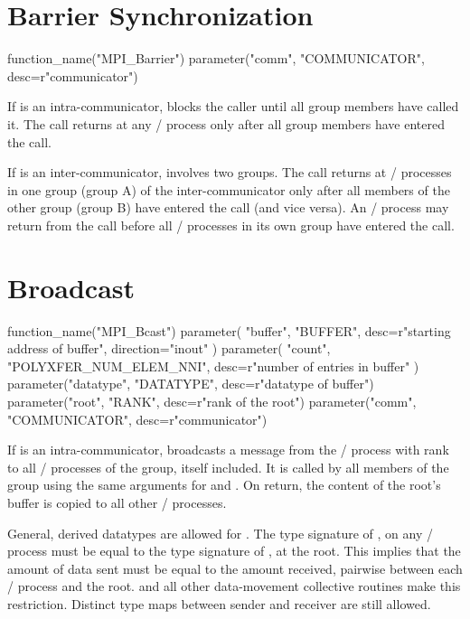 \section{Barrier Synchronization}
\label{sec:coll-barrier}

\begin{mpi-binding}
    function_name("MPI_Barrier")
    parameter("comm", "COMMUNICATOR", desc=r"communicator")
\end{mpi-binding}

If  is an intra-communicator,
 blocks the caller until all group members have called
it. The call returns at any \MPI/ process only after all group members have
entered the call.

If  is an inter-communicator,  involves two groups.
The call returns at \MPI/ processes in one group (group A) of the inter-communicator
only after all members of the other group (group B) have entered the call (and vice
versa).  An \MPI/ process may return from the call before all \MPI/ processes in its own group
have entered the call.

\section{Broadcast}
\label{sec:coll-broadcast}

\begin{mpi-binding}
    function_name("MPI_Bcast")
    parameter(
        "buffer", "BUFFER", desc=r"starting address of buffer", direction="inout"
    )
    parameter(
        "count", "POLYXFER_NUM_ELEM_NNI", desc=r"number of entries in buffer"
    )
    parameter("datatype", "DATATYPE", desc=r"datatype of buffer")
    parameter("root", "RANK", desc=r"rank of the root")
    parameter("comm", "COMMUNICATOR", desc=r"communicator")
\end{mpi-binding}

If  is an intra-communicator,
 broadcasts a message from
the \MPI/ process with rank  to all \MPI/ processes
of the group, itself included.
It is called by all members of
the
group using the same arguments for
and
.
On return, the
content of the root's buffer is copied to all other \MPI/ processes.

General, derived datatypes are allowed for .
The type signature of ,  on any \MPI/ process must
be equal to the type signature of ,  at the root.
This implies that the amount of data sent must be equal to the amount received,
pairwise between each \MPI/ process and the root.
 and all other data-movement collective routines
make this restriction.
Distinct type maps between sender and receiver are still allowed.

